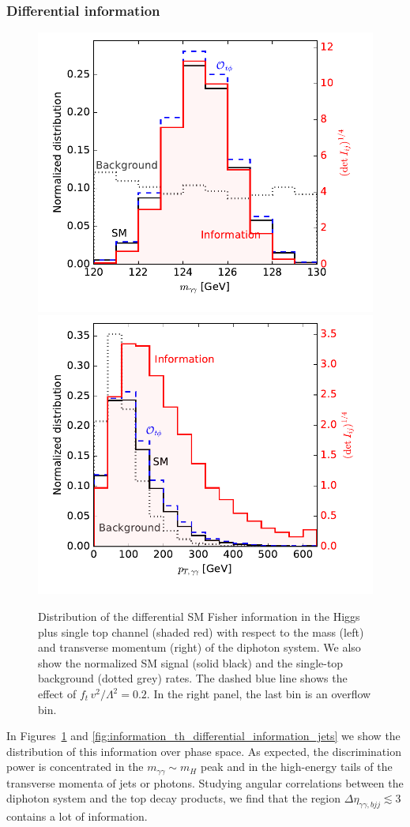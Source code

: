 \subsubsection{Differential information}

\begin{figure}
  \includegraphics[width=0.49 \textwidth]{fig/information/th_information_over_maa}%
  \includegraphics[width=0.49 \textwidth]{fig/information/th_information_over_ptaa}%
  \caption{Distribution of the differential SM Fisher information in
    the Higgs plus single top channel (shaded red) with respect to the
    mass (left) and transverse momentum (right) of the diphoton
    system. We also show the normalized SM signal (solid black) and
    the single-top background (dotted grey) rates. The dashed blue
    line shows the effect of $f_{t} \, v^2 / \Lambda^2 = 0.2$. In the
    right panel, the last bin is an overflow bin.}
  \label{fig:information_th_differential_information_photons}
\end{figure}

In Figures~\ref{fig:information_th_differential_information_photons}
and \ref{fig:information_th_differential_information_jets} we show the
distribution of this information over phase space. As expected, the
discrimination power is concentrated in the
$m_{\gamma \gamma} \sim m_H$ peak and in the high-energy tails of the
transverse momenta of jets or photons. Studying angular correlations
between the diphoton system and the top decay products, we find that the
region $\Delta \eta_{ \gamma \gamma, bjj} \lesssim 3$ contains a lot
of information.

